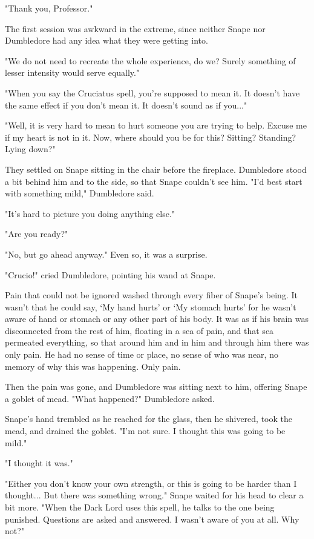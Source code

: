 \documentclass[a4paper,11pt]{article}
\begin{document}
"Thank you, Professor."

The first session was awkward in the extreme, since neither Snape nor Dumbledore had any idea what they were getting into.

"We do not need to recreate the whole experience, do we? Surely something of lesser intensity would serve equally."

"When you say the Cruciatus spell, you're supposed to mean it. It doesn't have the same effect if you don't mean it. It doesn't sound as if you..."

"Well, it is very hard to mean to hurt someone you are trying to help. Excuse me if my heart is not in it. Now, where should you be for this? Sitting? Standing? Lying down?"

They settled on Snape sitting in the chair before the fireplace. Dumbledore stood a bit behind him and to the side, so that Snape couldn't see him. "I'd best start with something mild," Dumbledore said.

"It's hard to picture you doing anything else."

"Are you ready?"

"No, but go ahead anyway." Even so, it was a surprise.

"Crucio!" cried Dumbledore, pointing his wand at Snape.

Pain that could not be ignored washed through every fiber of Snape's being. It wasn't that he could say, `My hand hurts' or `My stomach hurts' for he wasn't aware of hand or stomach or any other part of his body. It was as if his brain was disconnected from the rest of him, floating in a sea of pain, and that sea permeated everything, so that around him and in him and through him there was only pain. He had no sense of time or place, no sense of who was near, no memory of why this was happening. Only pain.

Then the pain was gone, and Dumbledore was sitting next to him, offering Snape a goblet of mead. "What happened?" Dumbledore asked.

Snape's hand trembled as he reached for the glass, then he shivered, took the mead, and drained the goblet. "I'm not sure. I thought this was going to be mild."

"I thought it was."

"Either you don't know your own strength, or this is going to be harder than I thought... But there was something wrong." Snape waited for his head to clear a bit more. "When the Dark Lord uses this spell, he talks to the one being punished. Questions are asked and answered. I wasn't aware of you at all. Why not?"
\end{document}
